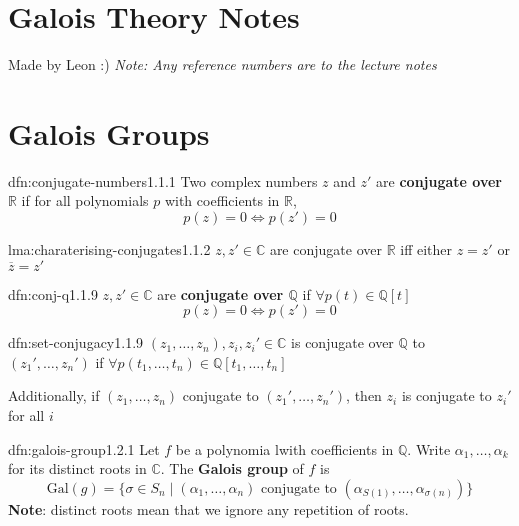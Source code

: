 \documentclass[landscape, 8pt]{extarticle}
\begin{document}
\setlength{\abovedisplayskip}{3.5pt}
\setlength{\belowdisplayskip}{3.5pt}
\setlength{\abovedisplayshortskip}{3.5pt}
\setlength{\belowdisplayshortskip}{3.5pt}

\begin{multicols}{3}
\raggedcolumns

\section*{\huge Galois Theory Notes}
Made by Leon :) \textit{Note: Any reference numbers are to the lecture notes}

\section{Galois Groups}

\begin{dfn}{dfn:conjugate-numbers}{1.1.1}
    Two complex numbers $z$ and $z'$ are \textbf{conjugate over $\mathbb{R}$} if for all polynomials $p$ with coefficients in $\mathbb{R}$,
    \[p(z) = 0 \iff p(z') = 0\]
\end{dfn}

\begin{lma}{lma:charaterising-conjugates}{1.1.2}
    $z,z'\in \mathbb{C}$ are conjugate over $\mathbb{R}$ iff either $z = z'$ or $\overline{z} = z'$
\end{lma}

\begin{dfn}{dfn:conj-q}{1.1.9}
    $z,z'\in \mathbb{C}$ are \textbf{conjugate over $\mathbb{Q}$} if $\forall p(t) \in \mathbb{Q}[t]$
    \[p(z) = 0 \iff p(z') = 0\]
\end{dfn}

\begin{dfn}{dfn:set-conjugacy}{1.1.9}
    $(z_{1},\dots,z_{n}), z_{i}, z_{i}' \in \mathbb{C}$
    is conjugate over $\mathbb{Q}$ to $(z_{1}',\dots,z_{n}')$
    if $\forall p(t_{1},\dots,t_{n})\in \mathbb{Q}[t_{1},\dots,t_{n}]$

    \longrule{0.08ex}

    Additionally, if $(z_{1},\dots,z_{n})$ conjugate to $(z_{1}',\dots,z_{n}')$, then $z_{i}$ is conjugate to $z_{i}'$ for all $i$
\end{dfn}


\begin{dfn}{dfn:galois-group}{1.2.1}
    Let $f$ be a polynomia lwith coefficients in $\mathbb{Q}$. Write $\alpha_{1},\dots,\alpha_{k}$ for its distinct roots in $\mathbb{C}$. The \textbf{Galois group} of $f$ is
    \[\mathrm{Gal}(g) = \{\sigma \in S_{n} \mid (\alpha_{1},\dots,\alpha_{n}) \text{ conjugate to } (\alpha_{S(1)},\dots,\alpha_{\sigma(n)})\}\]
    \textbf{Note}: distinct roots mean that we ignore any repetition of roots.
\end{dfn}


\end{multicols}
\end{document}

